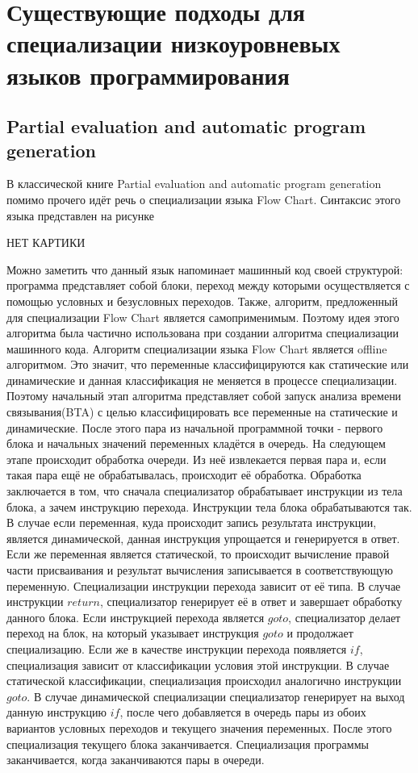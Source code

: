 \section{Существующие подходы для специализации низкоуровневых языков программирования}

\subsection{Partial evaluation and automatic program generation}
В классической книге Partial evaluation and automatic program generation \cite{PEAPG} помимо прочего идёт речь о специализации языка Flow Chart. Синтаксис этого языка представлен на рисунке %

{\LARGE НЕТ КАРТИКИ}

Можно заметить что данный язык напоминает машинный код своей структурой: программа представляет собой блоки, переход между которыми осуществляется с помощью условных и безусловных переходов. Также, алгоритм, предложенный для специализации Flow Chart является самоприменимым. Поэтому идея этого алгоритма была частично использована при создании алгоритма специализации машинного кода. Алгоритм специализации языка Flow Chart является offline алгоритмом. Это значит, что переменные классифицируются как статические или динамические и данная классификация не меняется в процессе специализации. Поэтому начальный этап алгоритма представляет собой запуск анализа времени связывания(BTA) с целью классифицировать все переменные на статические и динамические. После этого пара из начальной программной точки - первого блока и начальных значений переменных кладётся в очередь. На следующем этапе происходит обработка очереди. Из неё извлекается первая пара и, если такая пара ещё не обрабатывалась, происходит её обработка. Обработка заключается в том, что сначала специализатор обрабатывает инструкции из тела блока, а зачем инструкцию перехода. Инструкции тела блока обрабатываются так. В случае если переменная, куда происходит запись результата инструкции, является динамической, данная инструкция упрощается и генерируется в ответ. Если же переменная является статической, то происходит вычисление правой части присваивания и результат вычисления записывается в соответствующую переменную. Специализации инструкции перехода зависит от её типа. В случае инструкции $return$, специализатор генерирует её в ответ и завершает обработку данного блока. Если инструкцией перехода является $goto$, специализатор делает переход на блок, на который указывает инструкция $goto$ и продолжает специализацию. Если же в качестве инструкции перехода появляется $if$, специализация зависит от классификации условия этой инструкции. В случае статической классификации, специализация происходил аналогично инструкции $goto$. В случае динамической специализации специализатор генерирует на выход данную инструкцию $if$, после чего добавляется в очередь пары из обоих вариантов условных переходов и текущего значения переменных. После этого специализация текущего блока заканчивается. Специализация программы заканчивается, когда заканчиваются пары в очереди. 
